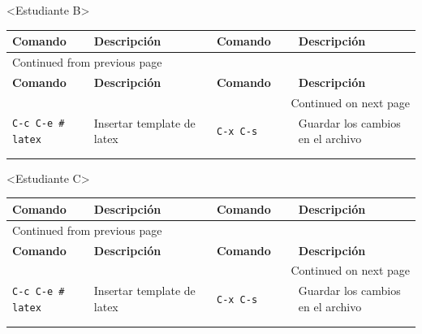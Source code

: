 \documentclass{article}
\begin{document}
<Estudiante B>
\begin{longtable}{|p{0.2\linewidth}|p{0.3\linewidth}|p{0.2\linewidth}|p{0.3\linewidth}|}
\textbf{Comando} & \textbf{Descripción} & \textbf{Comando} & \textbf{Descripción}\\[0pt]
\hline
\endfirsthead
\multicolumn{4}{l}{Continued from previous page} \\[0pt]
\hline

\textbf{Comando} & \textbf{Descripción} & \textbf{Comando} & \textbf{Descripción} \\[0pt]

\hline
\endhead
\hline\multicolumn{4}{r}{Continued on next page} \\
\endfoot
\endlastfoot
\hline
\texttt{C-c C-e \# latex} & Insertar template de  latex & \texttt{C-x C-s} & Guardar los cambios en el archivo\\[0pt]
 &  &  & \\[0pt]
 &  &  & \\[0pt]
\end{longtable}

<Estudiante C>
\begin{longtable}{|p{0.2\linewidth}|p{0.3\linewidth}|p{0.2\linewidth}|p{0.3\linewidth}|}
\textbf{Comando} & \textbf{Descripción} & \textbf{Comando} & \textbf{Descripción}\\[0pt]
\hline
\endfirsthead
\multicolumn{4}{l}{Continued from previous page} \\[0pt]
\hline

\textbf{Comando} & \textbf{Descripción} & \textbf{Comando} & \textbf{Descripción} \\[0pt]

\hline
\endhead
\hline\multicolumn{4}{r}{Continued on next page} \\
\endfoot
\endlastfoot
\hline
\texttt{C-c C-e \# latex} & Insertar template de  latex & \texttt{C-x C-s} & Guardar los cambios en el archivo\\[0pt]
 &  &  & \\[0pt]
 &  &  & \\[0pt]
\end{longtable}
\end{document}
